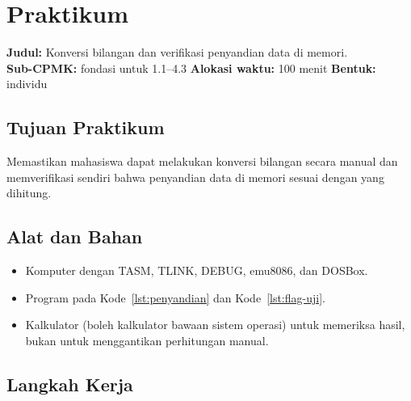 \section{Praktikum}
\label{sec:praktikum-bab2}

\begin{praktikumbox}
\textbf{Judul:} Konversi bilangan dan verifikasi penyandian data di
memori.\\[0.3em]
\textbf{Sub-CPMK:} fondasi untuk 1.1--4.3 \quad\textbullet\quad
\textbf{Alokasi waktu:} 100 menit \quad\textbullet\quad
\textbf{Bentuk:} individu
\end{praktikumbox}

\subsection{Tujuan Praktikum}

Memastikan mahasiswa dapat melakukan konversi bilangan secara manual
dan memverifikasi sendiri bahwa penyandian data di memori sesuai
dengan yang dihitung.

\subsection{Alat dan Bahan}

\begin{itemize}
    \item Komputer dengan TASM, TLINK, DEBUG, emu8086, dan DOSBox.
    \item Program pada Kode~\ref{lst:penyandian} dan
          Kode~\ref{lst:flag-uji}.
    \item Kalkulator  (boleh kalkulator bawaan sistem
          operasi) untuk memeriksa hasil, bukan untuk menggantikan
          perhitungan manual.
\end{itemize}

\subsection{Langkah Kerja}

